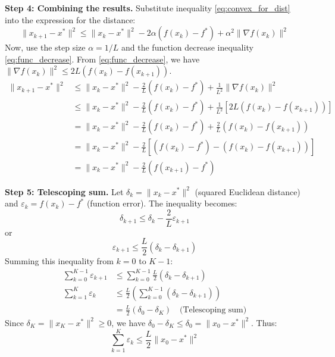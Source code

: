 \documentclass{article}
\newcommand{\norm}[1]{\|#1\|}          %
\newcommand{\grad}{\nabla}             %
\begin{document}
\textbf{Step 4: Combining the results.}
Substitute inequality \eqref{eq:convex_for_dist} into the expression for the distance:
\begin{equation*}
    \norm{x_{k+1} - x^*}^2 \le \norm{x_k - x^*}^2 - 2 \alpha (f(x_k) - f^*) + \alpha^2 \norm{\grad f(x_k)}^2
\end{equation*}
Now, use the step size $\alpha = 1/L$ and the function decrease inequality \eqref{eq:func_decrease}. From \eqref{eq:func_decrease}, we have $\norm{\grad f(x_k)}^2 \le 2 L (f(x_k) - f(x_{k+1}))$.
\begin{align*}
    \norm{x_{k+1} - x^*}^2 &\le \norm{x_k - x^*}^2 - \frac{2}{L} (f(x_k) - f^*) + \frac{1}{L^2} \norm{\grad f(x_k)}^2 \\
    &\le \norm{x_k - x^*}^2 - \frac{2}{L} (f(x_k) - f^*) + \frac{1}{L^2} [2 L (f(x_k) - f(x_{k+1}))] \\
    &= \norm{x_k - x^*}^2 - \frac{2}{L} (f(x_k) - f^*) + \frac{2}{L} (f(x_k) - f(x_{k+1})) \\
    &= \norm{x_k - x^*}^2 - \frac{2}{L} \left[ (f(x_k) - f^*) - (f(x_k) - f(x_{k+1})) \right] \\
    &= \norm{x_k - x^*}^2 - \frac{2}{L} (f(x_{k+1}) - f^*)
\end{align*}

\textbf{Step 5: Telescoping sum.}
Let $\delta_k = \norm{x_k - x^*}^2$ (squared Euclidean distance) and $\varepsilon_k = f(x_k) - f^*$ (function error). The inequality becomes:
\begin{equation*}
    \delta_{k+1} \le \delta_k - \frac{2}{L} \varepsilon_{k+1}
\end{equation*}
or
\begin{equation*}
    \varepsilon_{k+1} \le \frac{L}{2} (\delta_k - \delta_{k+1})
\end{equation*}
Summing this inequality from $k = 0$ to $K-1$:
\begin{align*}
    \sum_{k=0}^{K-1} \varepsilon_{k+1} &\le \sum_{k=0}^{K-1} \frac{L}{2} (\delta_k - \delta_{k+1}) \\
    \sum_{k=1}^{K} \varepsilon_k &\le \frac{L}{2} \left( \sum_{k=0}^{K-1} (\delta_k - \delta_{k+1}) \right) \\
    &= \frac{L}{2} (\delta_0 - \delta_K) \quad \text{(Telescoping sum)}
\end{align*}
Since $\delta_K = \norm{x_K - x^*}^2 \ge 0$, we have $\delta_0 - \delta_K \le \delta_0 = \norm{x_0 - x^*}^2$. Thus:
\begin{equation} \label{eq:sum_epsilon}
    \sum_{k=1}^{K} \varepsilon_k \le \frac{L}{2} \norm{x_0 - x^*}^2
\end{equation}
\end{document}
